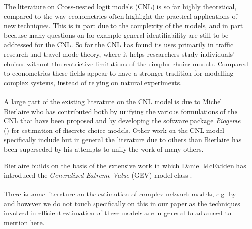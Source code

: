
The literature on Cross-nested logit models (CNL) is so far highly theoretical, compared to the way econometrics often highlight the practical applications of new techniques. This is in part due to the complexity of the models, and in part because many questions on for example general identifiability are still to be addressed for the CNL.
So far the CNL has found its uses primarily in traffic research and travel mode theory, where it helps researchers study individuals' choices without the restrictive limitations of the simpler choice models. Compared to econometrics these fields appear to have a stronger tradition for modelling complex systems, instead of relying on natural experiments.
\\ \\
A large part of the existing literature on the CNL model is due to Michel Bierlaire \citep{bierlaire_general_2001, bierlaire_biogeme:_2003, bierlaire_theoretical_2006, bierlaire_estimation_2008, bierlaire_estimation_2009} who has contributed both by unifying the various formulations of the CNL that have been proposed \citep{bierlaire_theoretical_2006} and by developing the software package \textit{Biogeme} (\cite{bierlaire_biogeme:_2003}) for estimation of discrete choice models. Other work on the CNL model specifically include \citet{papola_developments_2004} but in general the literature due to others than Bierlaire has been superseded by his attempts to unify the work of many others.

Bierlaire builds on the basis of the extensive work in which Daniel McFadden has introduced the \textit{Generalized Extreme Value} (GEV) model class \citep{mcfadden_modelling_1977, mcfadden_quantitative_1977, hausman_specification_1984}.
\\ \\
There is some literature on the estimation of complex network models, e.g. by \citet{newman_computational_2018} and \citet{mai_dynamic_2017} however we do not touch specifically on this in our paper as the techniques involved in efficient estimation of these models are in general to advanced to mention here.

